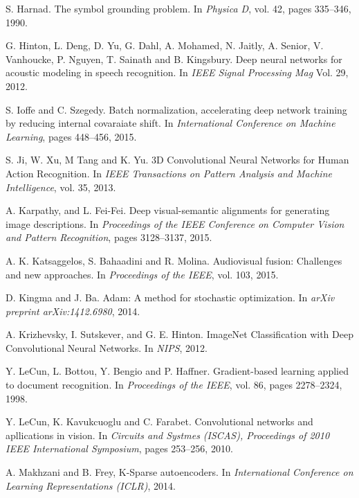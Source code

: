 \begin{thebibliography}{99}
{
  S. Harnad. The symbol grounding problem. In \textit{Physica D}, vol. 42,
  pages 335–346, 1990.

  G. Hinton, L. Deng, D. Yu, G. Dahl, A. Mohamed, N. Jaitly, A. Senior, V.
  Vanhoucke, P. Nguyen, T. Sainath and B. Kingsbury. Deep neural networks
  for acoustic modeling in speech recognition.
  In \textit{IEEE Signal Processing Mag} Vol. 29, 2012.

  S. Ioffe and C. Szegedy. Batch normalization, accelerating deep network
  training by reducing internal covaraiate shift. In \textit{International
  Conference on Machine Learning}, pages 448--456, 2015.

  S. Ji, W. Xu, M Tang and K. Yu. 3D Convolutional Neural Networks
  for Human Action Recognition. In \textit{IEEE Transactions on Pattern
  Analysis and Machine Intelligence}, vol. 35, 2013.

  A. Karpathy, and L. Fei-Fei. Deep visual-semantic alignments for
  generating image descriptions. In \textit{Proceedings of the IEEE
  Conference on Computer Vision and Pattern Recognition},
  pages 3128--3137, 2015.

  A. K. Katsaggelos, S. Bahaadini and R. Molina. Audiovisual fusion:
  Challenges and new approaches. In \textit{Proceedings of the IEEE},
  vol. 103, 2015.

  D. Kingma and J. Ba. Adam: A method for stochastic optimization.
  In \textit{arXiv preprint arXiv:1412.6980}, 2014.

  A. Krizhevsky, I. Sutskever, and G. E. Hinton.  ImageNet Classification
  with Deep Convolutional Neural Networks. In \textit{NIPS}, 2012.

  Y. LeCun, L. Bottou, Y. Bengio and P. Haffner. Gradient-based
  learning applied to document recognition. In \textit{Proceedings of the
  IEEE}, vol. 86, pages 2278--2324, 1998.

  Y. LeCun, K. Kavukcuoglu and C. Farabet. Convolutional networks and
  apllications in vision. In \textit{Circuits and Systmes (ISCAS), 
  Proceedings of 2010 IEEE International Symposium}, pages 253--256, 2010.

  A. Makhzani and B. Frey, K-Sparse autoencoders. In \textit{International
  Conference on Learning Representations (ICLR)}, 2014.

}
\end{thebibliography}
